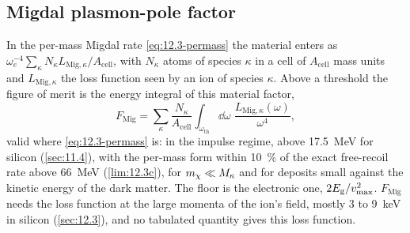 \subsection{Migdal plasmon-pole factor}\label{sec:17.5-migdal}

In the per-mass Migdal rate \cref{eq:12.3-permass} the material enters as $\omega_e^{-4}\sum_\kappa N_\kappa L_{\mathrm{Mig},\kappa}/A_{\mathrm{cell}}$, with $N_\kappa$ atoms of species $\kappa$ in a cell of $A_{\mathrm{cell}}$ mass units and $L_{\mathrm{Mig},\kappa}$ the loss function seen by an ion of species $\kappa$. Above a threshold the figure of merit is the energy integral of this material factor,
\begin{equation*}
  F_{\mathrm{Mig}} = \sum_\kappa\frac{N_\kappa}{A_{\mathrm{cell}}}\int_{\omega_{\mathrm{th}}}\dd\omega\;\frac{L_{\mathrm{Mig},\kappa}(\omega)}{\omega^4} ,
\end{equation*}
valid where \cref{eq:12.3-permass} is: in the impulse regime, above \SI{17.5}{MeV} for silicon (\cref{sec:11.4}), with the per-mass form within \SI{10}{\percent} of the exact free-recoil rate above \SI{66}{MeV} (\cref{lim:12.3c}), for $m_{\chi} \ll M_\kappa$ and for deposits small against the kinetic energy of the dark matter. The floor is the electronic one, $2E_{\mathrm{g}}/v_{\mathrm{max}}^2$. $F_{\mathrm{Mig}}$ needs the loss function at the large momenta of the ion's field, mostly 3 to \SI{9}{keV} in silicon (\cref{sec:12.3}), and no tabulated quantity gives this loss function.

